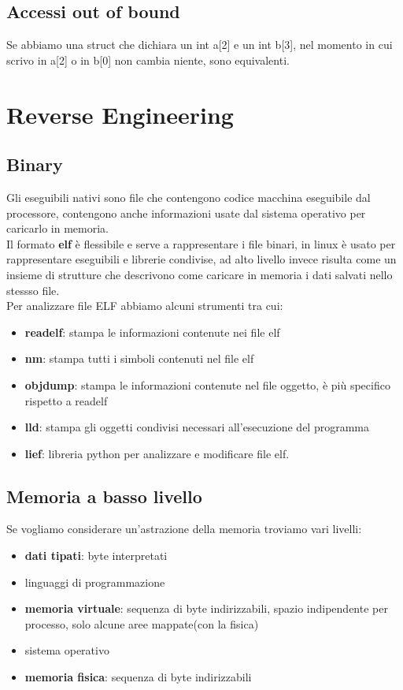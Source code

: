 \documentclass[oneside,a4paper,11pt]{book}
\theoremstyle{italicstyle}
\theoremstyle{normStyle}
\begin{document}
\subsection{Accessi out of bound}
Se abbiamo una struct che dichiara un int a[2] e un int b[3], nel momento in cui scrivo in a[2] o in b[0] non cambia niente, sono equivalenti.
\section{Reverse Engineering}
\subsection{Binary}
Gli eseguibili nativi sono file che contengono codice macchina eseguibile dal processore, contengono anche informazioni usate dal sistema operativo per caricarlo in memoria.\\
Il formato \textbf{elf} è flessibile e serve a rappresentare i file binari, in linux è usato per rappresentare eseguibili e librerie condivise, ad alto livello invece risulta come un insieme di strutture che descrivono come caricare in memoria i dati salvati nello stessso file.\\
Per analizzare file ELF abbiamo alcuni strumenti tra cui:
\begin{itemize}
  \item \textbf{readelf}: stampa le informazioni contenute nei file elf
  \item \textbf{nm}: stampa tutti i simboli contenuti nel file elf
\item \textbf{objdump}: stampa le informazioni contenute nel file oggetto, è più specifico rispetto a readelf
\item \textbf{lld}: stampa gli oggetti condivisi necessari all'esecuzione del programma
\item \textbf{lief}: libreria python per analizzare e modificare file elf.
\end{itemize}

\subsection{Memoria a basso livello}
Se vogliamo considerare un'astrazione della memoria troviamo vari livelli:
 \begin{itemize}
  \item \textbf{dati tipati}: byte interpretati
  \item linguaggi di programmazione
\item \textbf{memoria virtuale}: sequenza di byte indirizzabili, spazio indipendente per processo, solo alcune aree mappate(con la fisica)
\item sistema operativo
\item \textbf{memoria fisica}: sequenza di byte indirizzabili
\end{itemize}
\end{document}
